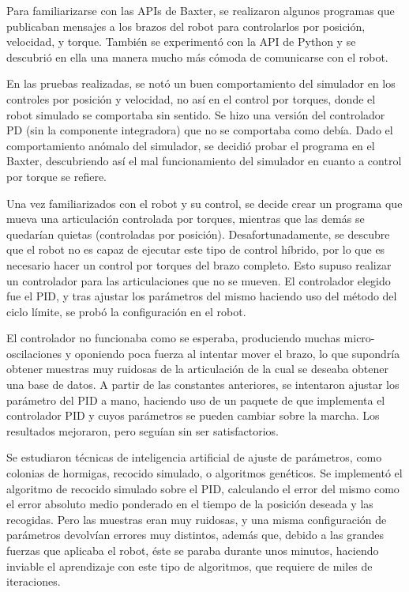 Para familiarizarse con las APIs de Baxter, se realizaron algunos programas que publicaban mensajes a los brazos del robot para controlarlos por posición, velocidad, y torque. También se experimentó con la API de Python y se descubrió en ella una manera mucho más cómoda de comunicarse con el robot.

En las pruebas realizadas, se notó un buen comportamiento del simulador en los controles por posición y velocidad, no así en el control por torques, donde el robot simulado se comportaba sin sentido. Se hizo una versión del controlador PD (sin la componente integradora) que no se comportaba como debía. Dado el comportamiento anómalo del simulador, se decidió probar el programa en el Baxter, descubriendo así el mal funcionamiento del simulador en cuanto a control por torque se refiere.

Una vez familiarizados con el robot y su control, se decide crear un programa que mueva una articulación controlada por torques, mientras que las demás se quedarían quietas (controladas por posición). Desafortunadamente, se descubre que el robot no es capaz de ejecutar este tipo de control híbrido, por lo que es necesario hacer un control por torques del brazo completo. Esto supuso realizar un controlador para las articulaciones que no se mueven. El controlador elegido fue el PID, y tras ajustar los parámetros del mismo haciendo uso del método del ciclo límite, se probó la configuración en el robot.

El controlador no funcionaba como se esperaba, produciendo muchas micro-oscilaciones y oponiendo poca fuerza al intentar mover el brazo, lo que supondría obtener muestras muy ruidosas de la articulación de la cual se deseaba obtener una base de datos. A partir de las constantes anteriores, se intentaron ajustar los parámetro del PID a mano, haciendo uso de un paquete de \ros que implementa el controlador PID y cuyos parámetros se pueden cambiar sobre la marcha. Los resultados mejoraron, pero seguían sin ser satisfactorios.

Se estudiaron técnicas de inteligencia artificial de ajuste de parámetros, como colonias de hormigas, recocido simulado, o algoritmos genéticos. Se implementó el algoritmo de recocido simulado sobre el PID, calculando el error del mismo como el error absoluto medio ponderado en el tiempo de la posición deseada y las recogidas. Pero las muestras eran muy ruidosas, y una misma configuración de parámetros devolvían errores muy distintos, además que, debido a las grandes fuerzas que aplicaba el robot, éste se paraba durante unos minutos, haciendo inviable el aprendizaje con este tipo de algoritmos, que requiere de miles de iteraciones.

